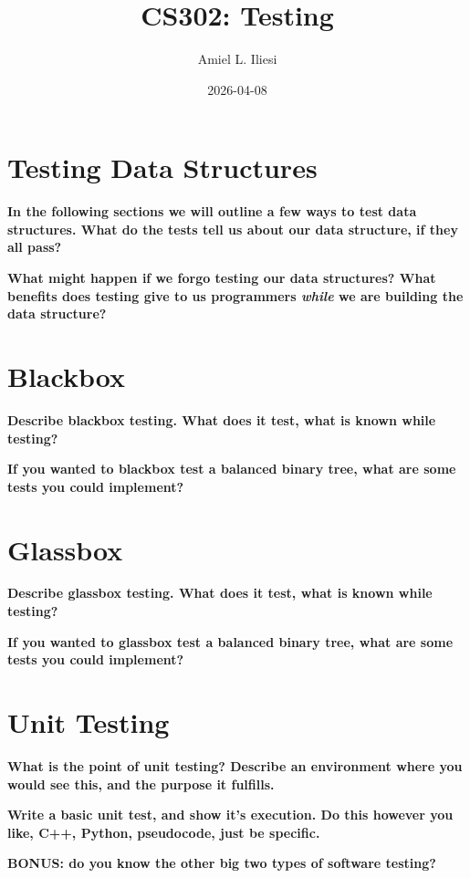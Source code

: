\documentclass[12pt, letterpaper]{article}
\title{CS302: Testing}
\author{Amiel L. Iliesi}
\date{2026-04-08}
\newcommand{\question}[2][4em]{\textbf{#2}\vspace{#1}\par}
\begin{document}
\maketitle

\tableofcontents

\pagebreak
\section{Testing Data Structures}

\question[8em]{In the following sections we will outline a few ways to test data
structures. What do the tests tell us about our data structure, if they all
pass?}

\question[8em]{What might happen if we forgo testing our data structures? What
benefits does testing give to us programmers \emph{while} we are building the
data structure?}

\pagebreak
\section{Blackbox}

\question[12em]{Describe blackbox testing. What does it test, what is known while
testing?}

\question[12em]{If you wanted to blackbox test a balanced binary tree, what are some
tests you could implement?}

\pagebreak
\section{Glassbox}

\question[12em]{Describe glassbox testing. What does it test, what is known while
testing?}

\question[12em]{If you wanted to glassbox test a balanced binary tree, what are some
tests you could implement?}

\pagebreak
\section{Unit Testing}

\question[8em]{What is the point of unit testing? Describe an environment where you
would see this, and the purpose it fulfills.}

\question[20em]{Write a basic unit test, and show it's execution. Do this
however you like, C++, Python, pseudocode, just be specific.}

\question{BONUS: do you know the other big two types of software testing?}
\end{document}
